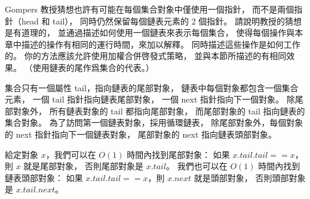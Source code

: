 \startEXERCISE
Gompers 教授猜想也許有可能在每個集合對象中僅使用一個指針，
而不是兩個指針（head 和 tail），
同時仍然保留每個鏈表元素的 2 個指針。
請說明教授的猜想是有道理的，
並通過描述如何使用一個鏈表來表示每個集合，
使得每個操作與本章中描述的操作有相同的運行時間，來加以解釋。
同時描述這些操作是如何工作的。
你的方法應該允許使用加權合併啓發式策略，
並與本節所描述的有相同效果。
（\hint 使用鏈表的尾作爲集合的代表。）
\stopEXERCISE

\startANSWER
集合只有一個屬性 tail，指向鏈表的尾部對象，
鏈表中每個對象都包含一個集合元素，
一個 tail 指針指向鏈表尾部對象，
一個 next 指針指向下一個對象。
除尾部對象外， 所有鏈表對象的 tail 都指向尾部對象，
而尾部對象的 tail 指向鏈表的集合對象。
為了訪問第一個鏈表對象，採用循環鏈表，
除尾部對象外，每個對象的 next 指針指向下一個鏈表對象，
尾部對象的 next 指向鏈表頭部對象。

給定對象 $x$，我們可以在 $O(1)$ 時間內找到尾部對象：
如果 $x.tail.tail == x$，則 $x$ 就是尾部對象，
否則尾部對象是 $x.tail$。
我們也可以在 $O(1)$ 時間內找到鏈表頭部對象：
如果 $x.tail.tail == x$，則 $x.next$ 就是頭部對象，
否則頭部對象是 $x.tail.next$。

\externalfigure[fig19_2-5-1]
\stopANSWER